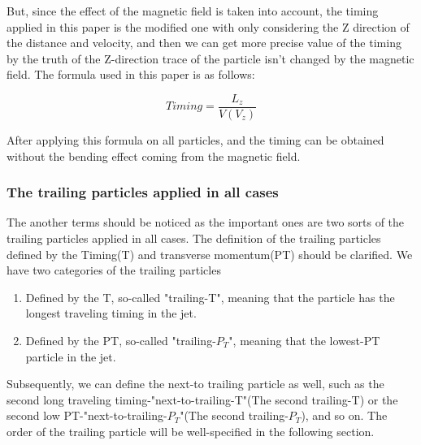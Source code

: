 But, since the effect of the magnetic field is taken into account, the timing applied in this paper is the modified one with only considering the Z direction of the distance and velocity, and then we can get more precise value of the timing by the truth of the Z-direction trace of the particle isn't changed by the magnetic field. The formula used in this paper is as follows: 

\begin{equation}
 Timing = \frac{L_{z}}{V(V_{z})} 
\end{equation}

After applying this formula on all particles, and the timing can be obtained without the bending effect coming from the magnetic field.\\ 

\subsubsection{The trailing particles applied in all cases}
The another terms should be noticed as the important ones are two sorts of the trailing particles applied in all cases. The definition of the trailing particles defined by the Timing(T) and transverse momentum(PT) should be clarified. We have two categories of the trailing particles
\begin{enumerate}
\item Defined by the T, so-called "trailing-T", meaning that the particle has the longest traveling timing in the jet. 
\item Defined by the PT, so-called "trailing-$P_{T}$", meaning that the lowest-PT particle in the jet. 
\end{enumerate}

Subsequently, we can define the next-to trailing particle as well, such as the second long traveling timing-"next-to-trailing-T"(The second trailing-T) or the second low PT-"next-to-trailing-$P_{T}$"(The second trailing-$P_{T}$), and so on. The order of the trailing particle will be well-specified in the following section.

